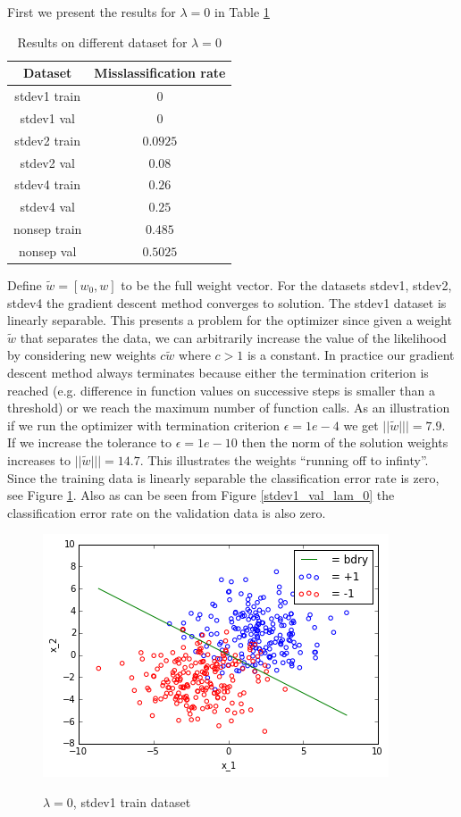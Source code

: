 \documentclass[10pt]{article}
\begin{document}
First we present the results for $\lambda = 0$ in Table \ref{lam_0}
\begin{table}[H]
\begin{tabular}{|c|c|}
\hline
\textbf{Dataset} & \textbf{Misslassification rate} \\ \hline
stdev1 train & $0$\\ \hline
stdev1 val & $0$\\ \hline
stdev2 train & $0.0925$\\ \hline
stdev2 val & $0.08$\\ \hline
stdev4 train & $0.26$\\ \hline
stdev4 val & $0.25$\\ \hline
nonsep train & $0.485$\\ \hline
nonsep val & $0.5025$\\ \hline
\end{tabular}
\label{lam_0}
\caption{Results on different dataset for $\lambda = 0$}
\end{table}


 Define $\tilde{w} = [w_0,w]$ to be the full weight vector. For the datasets stdev1, stdev2, stdev4 the gradient descent method converges to solution. The stdev1 dataset is linearly separable. This presents a problem for the optimizer since given a weight $\tilde{w}$ that separates the data, we can arbitrarily increase the value of the likelihood by considering new weights $c \tilde{w}$ where $c > 1$ is a constant. In practice our gradient descent method always terminates because either the termination criterion is reached (e.g. difference in function values on successive steps is smaller than a threshold) or we reach the maximum number of function calls. As an illustration if we run the optimizer with termination criterion $\epsilon = 1e-4$ we get $||\tilde{w}||| = 7.9$. If we increase the tolerance to $\epsilon = 1e-10$ then the norm of the solution weights increases to $||\tilde{w}||| = 14.7$. This illustrates the weights ``running off to infinty''. Since the training data is linearly separable the classification error rate is zero, see Figure \ref{stdev1_train_lam_0}. Also as can be seen from Figure \ref{stdev1_val_lam_0} the classification error rate on the validation data is also zero.

\begin{figure}
 \centering
 \includegraphics[scale=0.5]{stdev1_train_lam_0.png}
 \label{stdev1_train_lam_0}
 \caption{$\lambda = 0$, stdev1 train dataset}
 \end{figure}
\end{document}
